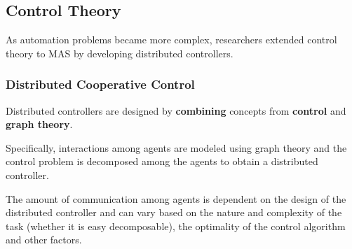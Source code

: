 \documentclass{article}
\begin{document}
			\subsection{Control Theory} 
				As automation problems became more complex, researchers extended control theory to MAS by developing distributed controllers.
				
				\subsubsection{Distributed Cooperative Control} Distributed controllers are designed by \textbf{combining} concepts from \textbf{control} and \textbf{graph theory}. 
				
				Specifically, interactions among agents are modeled using graph theory and the control problem is decomposed among the agents to obtain a distributed controller. 
				
				The amount of communication among agents is dependent on the design of the distributed controller and can vary based on the nature and complexity of the task (whether it is easy decomposable), the optimality of the control algorithm and other factors. 
				
\end{document}
